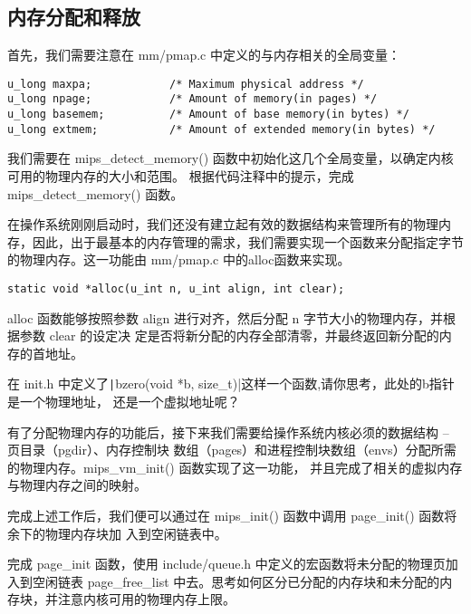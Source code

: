 \subsection{内存分配和释放}

首先，我们需要注意在 mm/pmap.c 中定义的与内存相关的全局变量：

\begin{verbatim}
u_long maxpa;            /* Maximum physical address */
u_long npage;            /* Amount of memory(in pages) */
u_long basemem;          /* Amount of base memory(in bytes) */
u_long extmem;           /* Amount of extended memory(in bytes) */
\end{verbatim}

\begin{exercise}
我们需要在 mips\_detect\_memory() 函数中初始化这几个全局变量，以确定内核可用的物理内存的大小和范围。
根据代码注释中的提示，完成 mips\_detect\_memory() 函数。
\end{exercise}

在操作系统刚刚启动时，我们还没有建立起有效的数据结构来管理所有的物理内存，因此，出于最基本的内存管理的需求，我们需要实现一个函数来分配指定字节的物理内存。这一功能由 mm/pmap.c 中的alloc函数来实现。

\begin{verbatim}
static void *alloc(u_int n, u_int align, int clear);
\end{verbatim}

alloc 函数能够按照参数 align 进行对齐，然后分配 n 字节大小的物理内存，并根据参数 clear 的设定决
定是否将新分配的内存全部清零，并最终返回新分配的内存的首地址。

\begin{thinking}\label{think-bzero}
在 init.h 中定义了\texttt|bzero(void *b, size_t)|这样一个函数,请你思考，此处的b指针是一个物理地址，
还是一个虚拟地址呢？
\end{thinking}

有了分配物理内存的功能后，接下来我们需要给操作系统内核必须的数据结构 -- 页目录（pgdir）、内存控制块
数组（pages）和进程控制块数组（envs）分配所需的物理内存。mips\_vm\_init() 函数实现了这一功能，
并且完成了相关的虚拟内存与物理内存之间的映射。

完成上述工作后，我们便可以通过在 mips\_init() 函数中调用 page\_init() 函数将余下的物理内存块加
入到空闲链表中。

\begin{exercise}
完成 page\_init 函数，使用 include/queue.h 中定义的宏函数将未分配的物理页加入到空闲链表
page\_free\_list 中去。思考如何区分已分配的内存块和未分配的内存块，并注意内核可用的物理内存上限。
\end{exercise}

